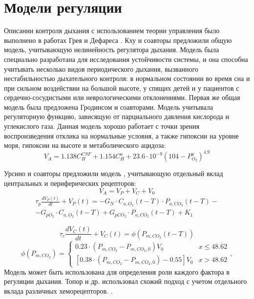 \section{Модели регуляции}
Описании контроля дыхания с использованием теории управления было выполнено в работах Грея \cite{Gray1946} и Дефареса \cite{Defares1964}. Кху и соавторы \cite{Khoo1982} предложили общую модель, учитывающую нелинейность регулятора дыхания. Модель была специально разработана для исследования устойчивости системы, и она способна учитывать несколько видов периодического дыхания, вызванного нестабильностью дыхательного контроля: в нормальном состоянии во время сна и при сильном воздействии на большой высоте, у спящих детей и у пациентов с сердечно-сосудистыми или неврологическими отклонениями. Первая же общая модель была предложена Гродинсом \cite{Grodins1967} и соавторами. Модель учитывала регуляторную функцию, зависящую от парциального давления кислорода и углекислого газа. Данная модель хорошо работает с точки зрения воспроизведения отклика на нормальные условия, а также гипоксии на уровне моря, гипоксии на высоте и метаболического ацидоза:
\begin{equation}
V_{A}=1.138C_{H}^{CSF}+1.154C_{H}^{a}+23.6\cdot 10^{-9}(104-P_{O_{2}}^a)^{4.9}
\end{equation}

Урсино и соавторы предложили модель \cite{Mauro1998,Ursino1994}, учитывающую отдельный вклад центральных и периферических рецепторов:
\begin{equation}
V_{A}=V_{P}+V_{C}+V_{0}
\end{equation}
\begin{equation}
\begin{array}{l}
\tau_{p}\frac{dV_{P}(t)}{dt}+V_{P}(t)=-G_{N}\cdot C_{a,O_{2}}(t-T) \cdot P_{a,CO_{2}}(t-T)-\\-G_{pO_{2}} \cdot C_{a,O_{2}}(t-T)+G_{pCO_{2}} \cdot P_{a,CO_{2}}(t-T)+K_{1}
\end{array}
\end{equation}

\begin{equation}
\tau_{c}\frac{dV_{C}(t)}{dt}+V_{C}(t)=\phi(P_{m,CO_{2}}(t-T))
\end{equation}
\begin{equation} 
\phi(P_{m,CO_{2}})=\begin{cases}
0.23\cdot (P_{m,CO_{2}}-P_{m,CO_{2},0})V_{0} & x \le 48.62  \\
[0.38\cdot (P_{m,CO_{2}}-P_{m,CO_{2},0})-0.55]V_{0} & x > 48.62
\end{cases},
\end{equation}
Модель может быть использована для определения роли каждого фактора в регуляции дыхания. Топор и др.\cite{topor2004} использовал схожий подход с учетом отдельного вклада различных хеморецепторов. .

